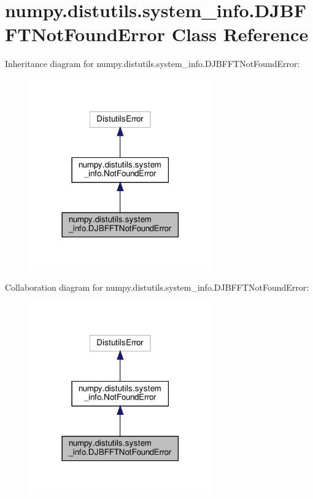\hypertarget{classnumpy_1_1distutils_1_1system__info_1_1DJBFFTNotFoundError}{}\section{numpy.\+distutils.\+system\+\_\+info.\+D\+J\+B\+F\+F\+T\+Not\+Found\+Error Class Reference}
\label{classnumpy_1_1distutils_1_1system__info_1_1DJBFFTNotFoundError}


Inheritance diagram for numpy.\+distutils.\+system\+\_\+info.\+D\+J\+B\+F\+F\+T\+Not\+Found\+Error\+:
\nopagebreak
\begin{figure}[H]
\begin{center}
\leavevmode
\includegraphics[width=222pt]{classnumpy_1_1distutils_1_1system__info_1_1DJBFFTNotFoundError__inherit__graph}
\end{center}
\end{figure}


Collaboration diagram for numpy.\+distutils.\+system\+\_\+info.\+D\+J\+B\+F\+F\+T\+Not\+Found\+Error\+:
\nopagebreak
\begin{figure}[H]
\begin{center}
\leavevmode
\includegraphics[width=222pt]{classnumpy_1_1distutils_1_1system__info_1_1DJBFFTNotFoundError__coll__graph}
\end{center}
\end{figure}


